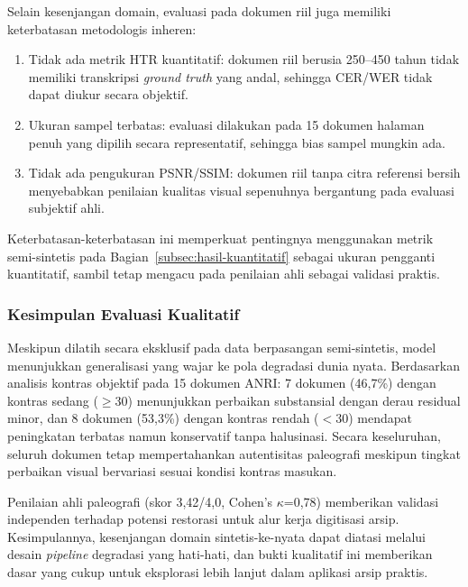 Selain kesenjangan domain, evaluasi pada dokumen riil juga memiliki keterbatasan metodologis inheren:
\begin{enumerate}[leftmargin=1.5em, labelsep=0.5em, itemindent=0pt, noitemsep, topsep=0pt]
    \item Tidak ada metrik HTR kuantitatif: dokumen riil berusia 250--450 tahun tidak memiliki transkripsi \textit{ground truth} yang andal, sehingga CER/WER tidak dapat diukur secara objektif.
    \item Ukuran sampel terbatas: evaluasi dilakukan pada 15 dokumen halaman penuh yang dipilih secara representatif, sehingga bias sampel mungkin ada.
    \item Tidak ada pengukuran PSNR/SSIM: dokumen riil tanpa citra referensi bersih menyebabkan penilaian kualitas visual sepenuhnya bergantung pada evaluasi subjektif ahli.
\end{enumerate}

Keterbatasan-keterbatasan ini memperkuat pentingnya menggunakan metrik semi-sintetis pada Bagian~\ref{subsec:hasil-kuantitatif} sebagai ukuran pengganti kuantitatif, sambil tetap mengacu pada penilaian ahli sebagai validasi praktis.

\subsubsection{Kesimpulan Evaluasi Kualitatif}
\label{subsubsec:kesimpulan-evaluasi-kualitatif}

Meskipun dilatih secara eksklusif pada data berpasangan semi-sintetis, model menunjukkan generalisasi yang wajar ke pola degradasi dunia nyata. Berdasarkan analisis kontras objektif pada 15 dokumen ANRI: 7 dokumen (46,7\%) dengan kontras sedang ($\geq$30) menunjukkan perbaikan substansial dengan derau residual minor, dan 8 dokumen (53,3\%) dengan kontras rendah ($<$30) mendapat peningkatan terbatas namun konservatif tanpa halusinasi. Secara keseluruhan, seluruh dokumen tetap mempertahankan autentisitas paleografi meskipun tingkat perbaikan visual bervariasi sesuai kondisi kontras masukan.

Penilaian ahli paleografi (skor 3,42/4,0, Cohen's $\kappa$=0,78) memberikan validasi independen terhadap potensi restorasi untuk alur kerja digitisasi arsip. Kesimpulannya, kesenjangan domain sintetis-ke-nyata dapat diatasi melalui desain \textit{pipeline} degradasi yang hati-hati, dan bukti kualitatif ini memberikan dasar yang cukup untuk eksplorasi lebih lanjut dalam aplikasi arsip praktis.

